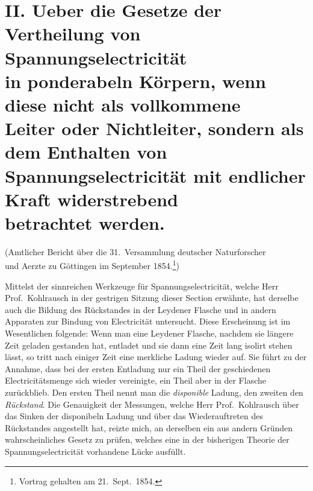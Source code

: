 \documentclass[12pt,a4paper]{article}
\begin{document}

\section*{II. Ueber die Gesetze der Vertheilung von Spannungselectricität\\
in ponderabeln Körpern, wenn diese nicht als vollkommene\\
Leiter oder Nichtleiter, sondern als dem Enthalten von\\
Spannungselectricität mit endlicher Kraft widerstrebend\\
betrachtet werden.}

\begin{center}
\small
(Amtlicher Bericht über die 31.~Versammlung deutscher Naturforscher\\
und Aerzte zu Göttingen im September 1854.\footnote{Vortrag gehalten am 21.~Sept.~1854.})
\end{center}
\vspace{0.5em}

Mittelst der sinnreichen Werkzeuge für Spannungselectricität, welche Herr Prof.\ Kohlrausch in der gestrigen Sitzung dieser Section erwähnte, hat derselbe auch die Bildung des Rückstandes in der Leydener Flasche und in andern Apparaten zur Bindung von Electricität untersucht. Diese Erscheinung ist im Wesentlichen folgende: Wenn man eine Leydener Flasche, nachdem sie längere Zeit geladen gestanden hat, entladet und sie dann eine Zeit lang isolirt stehen lässt, so tritt nach einiger Zeit eine merkliche Ladung wieder auf. Sie führt zu der Annahme, dass bei der ersten Entladung nur ein Theil der geschiedenen Electricitätsmenge sich wieder vereinigte, ein Theil aber in der Flasche zurückblieb. Den ersten Theil nennt man die \textit{disponible} Ladung, den zweiten den \textit{Rückstand}. Die Genauigkeit der Messungen, welche Herr Prof.~Kohlrausch über das Sinken der disponibeln Ladung und über das Wiederauftreten des Rückstandes angestellt hat, reizte mich, an derselben ein aus andern Gründen wahrscheinliches Gesetz zu prüfen, welches eine in der bisherigen Theorie der Spannungselectricität vorhandene Lücke ausfüllt.
\end{document}
